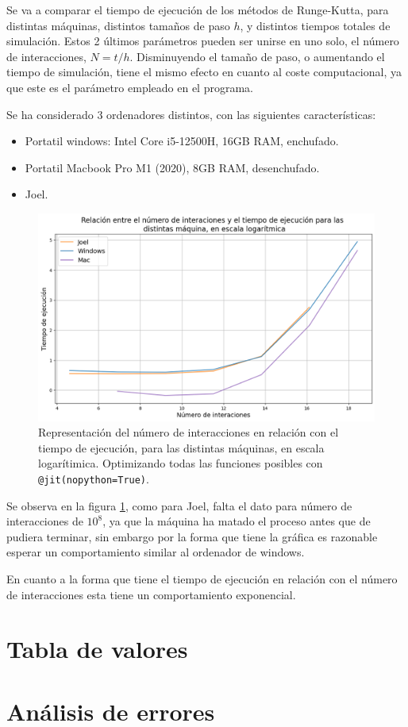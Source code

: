 \documentclass[11pt, twoside]{article} %
\begin{document}
Se va a comparar el tiempo de ejecución de los métodos de Runge-Kutta, para 
distintas máquinas, distintos tamaños de paso $h$, y distintos tiempos totales
de simulación. Estos 2 últimos parámetros pueden ser unirse en uno solo, 
el número de interacciones, $N = t/h$. Disminuyendo el tamaño de paso, o 
aumentando el tiempo de simulación, tiene el mismo efecto en cuanto al coste
computacional, ya que este es el parámetro empleado en el programa.

Se ha considerado 3 ordenadores distintos, con las siguientes características:
\begin{itemize}
    \item Portatil windows: Intel Core i5-12500H, 16GB RAM, enchufado.
    \item Portatil Macbook Pro M1 (2020), 8GB RAM, desenchufado.
    \item Joel.
\end{itemize}

\begin{figure}[h!]
    \centering
    \includegraphics[width=\linewidth]{plots/optimizacion.png}
    \caption{Representación del número de interacciones en relación con el tiempo 
    de ejecución, para las distintas máquinas, en escala logarítimica. Optimizando
    todas las funciones posibles con \texttt{@jit(nopython=True)}.}
    \label{fig:optimizacion}
\end{figure}

Se observa en la figura \ref{fig:optimizacion}, como para Joel, falta el dato 
para número de interacciones de $10^8$, ya que la máquina ha matado el proceso
antes que de pudiera terminar, sin embargo por la forma que tiene la gráfica es 
razonable esperar un comportamiento similar al ordenador de windows.

En cuanto a la forma que tiene el tiempo de ejecución en relación con el número de interacciones esta tiene un comportamiento exponencial.

\newpage

\appendix

\section{Tabla de valores}


\newpage

\section{Análisis de errores}
\end{document}
